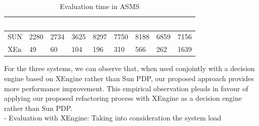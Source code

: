 {\begin{table}[h!]
\begin{tabular}{|l|l|l|l|l|l|l|l|l|}
& \scriptsize \bf \textcolor  {white}{S} 
& \scriptsize \bf \textcolor  {white}{A}
& \scriptsize \bf \textcolor {white}{IA}\\ \hline
\scriptsize  {SUN }
& \scriptsize  {2280}
& \scriptsize {2734}
& \scriptsize {3625}
& \scriptsize {8297}
& \scriptsize {7750}

& \scriptsize {8188}
& \scriptsize {6859}
& \scriptsize {7156}
  \\ \hline
\scriptsize  {XEn}
& \scriptsize  {49}
& \scriptsize {60}
& \scriptsize {104}
& \scriptsize {196}
& \scriptsize {310}

& \scriptsize {566}
& \scriptsize {262}
& \scriptsize {1639}
  \\ \hline
\end{tabular}
\caption{Evaluation time in ASMS}\end{table}

For the three systems, we can observe that, when used conjointly with a decision engine based on XEngine rather than Sun PDP, our proposed approach 
provides more performance improvement. This empirical observation pleads in favour of applying our proposed refactoring process with XEngine as a decision engine rather than Sun PDP.\\
- Evaluation with XEngine: Taking into consideration the system load

}
